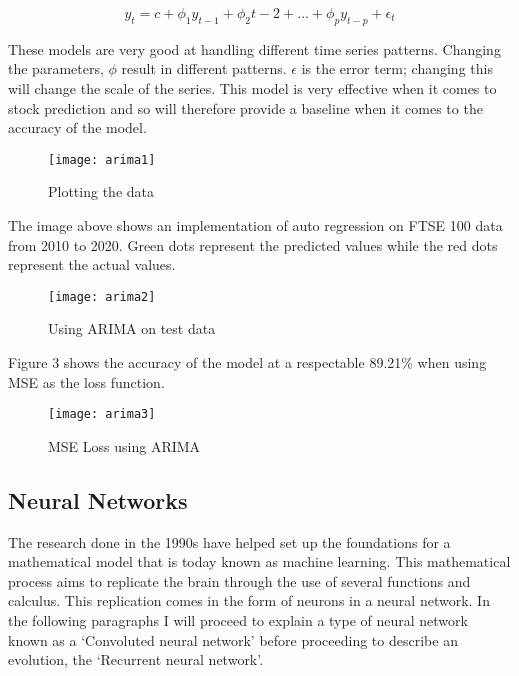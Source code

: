 \documentclass{article}
\begin{document}
\begin{equation}
    y_t = c + \phi_1 y_{t-1} + \phi_2 {t-2} + ... + \phi_p y_{t-p} + \epsilon_t
\end{equation}

These models are very good at handling different time series patterns. Changing the parameters, $\phi$ result in different patterns. $\epsilon$ is the error term; changing this will change the scale of the series. This model is very effective when it comes to stock prediction and so will therefore provide a baseline when it comes to the accuracy of the model.
\begin{figure}[h!]
  \texttt{[image: arima1]}
    \caption{Plotting the data }
\end{figure}
The image above shows an implementation of auto regression on FTSE 100 data from 2010 to 2020. Green dots represent the predicted values while the red dots represent the actual values.
\begin{wrapfigure}
    \centering
    \texttt{[image: arima2]}
    \caption{Using ARIMA on test data }
\end{wrapfigure}
Figure 3 shows the accuracy of the model at a respectable 89.21\% when using MSE as the loss function.
\begin{figure}[h!]
    \centering
    \texttt{[image: arima3]}
    \caption{MSE Loss using ARIMA }
\end{figure}

\subsection{Neural Networks}
The research done in the 1990s have helped set up the foundations for a mathematical model that is today known as machine learning. This mathematical process aims to replicate the brain through the use of several functions and calculus. This replication comes in the form of neurons in a neural network. In the following paragraphs I will proceed to explain a type of neural network known as a ‘Convoluted neural network’ before proceeding to describe an evolution, the ‘Recurrent neural network’.
\end{document}
